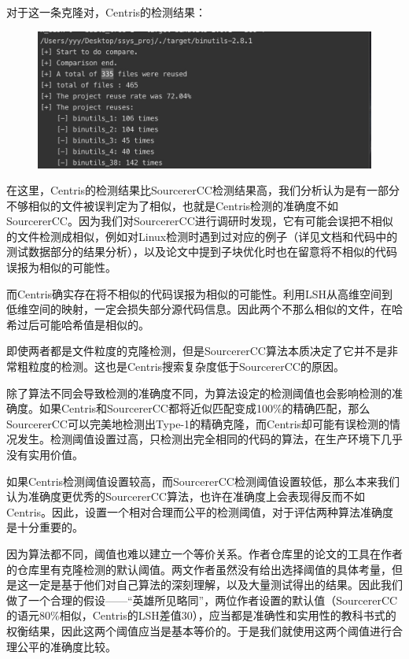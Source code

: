 \documentclass{cjc}
\begin{document}
对于这一条克隆对，Centris的检测结果：

\begin{figure}[htb]
  \centering
  \includegraphics[width=\linewidth]{pics/Centris gnu.jpg}
\end{figure}

在这里，Centris的检测结果比SourcererCC检测结果高，我们分析认为是有一部分不够相似的文件被误判定为了相似，也就是Centris检测的准确度不如SourcererCC。因为我们对SourcererCC进行调研时发现，它有可能会误把不相似的文件检测成相似，例如对Linux检测时遇到过对应的例子（详见文档和代码中的测试数据部分的结果分析），以及论文中提到子块优化时也在留意将不相似的代码误报为相似的可能性。

而Centris确实存在将不相似的代码误报为相似的可能性。利用LSH从高维空间到低维空间的映射，一定会损失部分源代码信息。因此两个不那么相似的文件，在哈希过后可能哈希值是相似的。

即使两者都是文件粒度的克隆检测，但是SourcererCC算法本质决定了它并不是非常粗粒度的检测。这也是Centris搜索复杂度低于SourcererCC的原因。

除了算法不同会导致检测的准确度不同，为算法设定的检测阈值也会影响检测的准确度。如果Centris和SourcererCC都将近似匹配变成100\%的精确匹配，那么SourcererCC可以完美地检测出Type-1的精确克隆，而Centris却可能有误检测的情况发生。检测阈值设置过高，只检测出完全相同的代码的算法，在生产环境下几乎没有实用价值。

如果Centris检测阈值设置较高，而SourcererCC检测阈值设置较低，那么本来我们认为准确度更优秀的SourcererCC算法，也许在准确度上会表现得反而不如Centris。因此，设置一个相对合理而公平的检测阈值，对于评估两种算法准确度是十分重要的。

因为算法都不同，阈值也难以建立一个等价关系。作者仓库里的论文的工具在作者的仓库里有克隆检测的默认阈值。两文作者虽然没有给出选择阈值的具体考量，但是这一定是基于他们对自己算法的深刻理解，以及大量测试得出的结果。因此我们做了一个合理的假设——“英雄所见略同”，两位作者设置的默认值（SourcererCC的语元80\%相似，Centris的LSH差值30），应当都是准确性和实用性的教科书式的权衡结果，因此这两个阈值应当是基本等价的。于是我们就使用这两个阈值进行合理公平的准确度比较。
\end{document}
